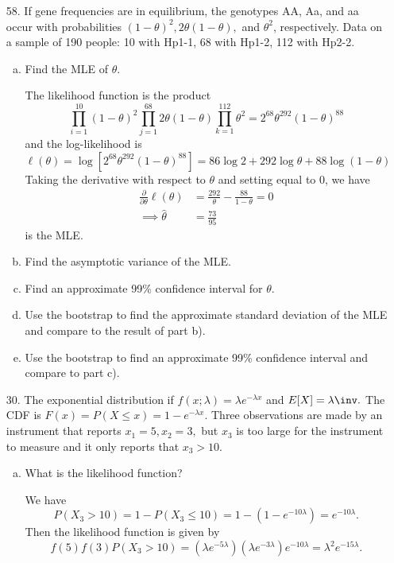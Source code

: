 \documentclass{article}
\begin{document}
\begin{itemize}
	\item[58.] If gene frequencies are in equilibrium, the genotypes AA, Aa, and aa occur with probabilities $(1-\theta)^2, 2\theta(1-\theta),$ and $\theta^2$, respectively. Data on a sample of 190 people: 10 with Hp1-1, 68 with Hp1-2, 112 with Hp2-2.

		\begin{enumerate}[a.]
			\item Find the MLE of $\theta.$
				\begin{soln}
					The likelihood function is the product \[\prod_{i=1}^{10} (1-\theta)^2 \prod_{j=1}^{68} 2\theta(1-\theta)\prod_{k=1}^{112} \theta^2 = 2^{68} \theta^{292}(1-\theta)^{88}\] and the log-likelihood is \[\ell(\theta) = \log\left[ 2^{68}\theta^{292}(1-\theta)^{88} \right]=86\log 2 + 292\log \theta + 88\log(1-\theta)\] Taking the derivative with respect to $\theta$ and setting equal to 0, we have
					\begin{align*}
						\frac{\partial}{\partial\theta}\ell(\theta) &= \frac{292}{\theta}-\frac{88}{1-\theta} = 0 \\
						\implies \hat{\theta} &= \frac{73}{95}
					\end{align*} is the MLE.
					
				\end{soln}

			\item Find the asymptotic variance of the MLE.

			\item Find an approximate 99\% confidence interval for $\theta.$

			\item Use the bootstrap to find the approximate standard deviation of the MLE and compare to the result of part b).

			\item Use the bootstrap to find an approximate 99\% confidence interval and compare to part c).
				
		\end{enumerate}

	\item[30.] The exponential distribution if $f(x;\lambda)=\lambda e^{-\lambda x}$ and $E[X]=\lambda\inv.$ The CDF is $F(x)=P(X\le x)=1-e^{-\lambda x}.$ Three observations are made by an instrument that reports $x_1=5, x_2=3,$ but $x_3$ is too large for the instrument to measure and it only reports that $x_3>10.$

		\begin{enumerate}[a.]
			\item What is the likelihood function?
				\begin{soln}
					We have \[P(X_3>10)=1-P(X_3\le 10)=1-(1-e^{-10\lambda})=e^{-10\lambda}.\] Then the likelihood function is given by \[f(5)f(3)P(X_3>10)=(\lambda e^{-5\lambda})(\lambda e^{-3\lambda})e^{-10\lambda}=\lambda^2 e^{-15\lambda}.\]
					

\end{soln}
\end{enumerate}
\end{itemize}
\end{document}
